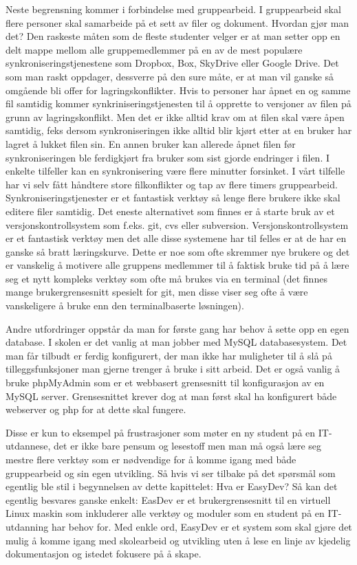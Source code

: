 Neste begrensning kommer i forbindelse med gruppearbeid. I gruppearbeid skal flere personer skal samarbeide på et sett av filer og dokument. Hvordan gjør man det? Den raskeste måten som de fleste studenter velger er at man setter opp en delt mappe mellom alle gruppemedlemmer på en av de mest populære synkroniseringstjenestene som Dropbox, Box, SkyDrive eller Google Drive. Det som man raskt oppdager, dessverre på den sure måte, er at man vil ganske så omgående bli offer for lagringskonflikter. Hvis to personer har åpnet en og samme fil samtidig kommer synkriniseringstjenesten til å opprette to versjoner av filen på grunn av lagringskonflikt. Men det er ikke alltid krav om at filen skal være åpen samtidig, feks dersom synkroniseringen ikke alltid blir kjørt etter at en bruker har lagret å lukket filen sin. En annen bruker kan allerede åpnet filen før synkroniseringen ble ferdigkjørt fra bruker som sist gjorde endringer i filen. I enkelte tilfeller kan en synkronisering være flere minutter forsinket. I vårt tilfelle har vi selv fått håndtere store filkonflikter og tap av flere timers gruppearbeid. Synkroniseringstjenester er et fantastisk verktøy så lenge flere brukere ikke skal editere filer samtidig. Det eneste alternativet som finnes er å starte bruk av et versjonskontrollsystem som f.eks. git, cvs eller subversion. Versjonskontrollsystem er et fantastisk verktøy men det alle disse systemene har til felles er at de har en ganske så bratt læringskurve. Dette er noe som ofte skremmer nye brukere og det er vanskelig å motivere alle gruppens medlemmer til å faktisk bruke tid på å lære seg et nytt kompleks verktøy som ofte må brukes via en terminal (det finnes mange brukergrensesnitt spesielt for git, men disse viser seg ofte å være vanskeligere å bruke enn den terminalbaserte løsningen).

Andre utfordringer oppstår da man for første gang har behov å sette opp en egen database. I skolen er det vanlig at man jobber med MySQL databasesystem. Det man får tilbudt er ferdig konfigurert, der man ikke har muligheter til å slå på tilleggsfunksjoner man gjerne trenger å bruke i sitt arbeid. Det er også vanlig å bruke phpMyAdmin som er et webbasert grensesnitt til konfigurasjon av en MySQL server. Grensesnittet krever dog at man først skal ha konfigurert både webserver og php for at dette skal fungere.

Disse er kun to eksempel på frustrasjoner som møter en ny student på en IT-utdannese, det er ikke bare pensum og lesestoff men man må også lære seg mestre flere verktøy som er nødvendige for å komme igang med både gruppearbeid og sin egen utvikling. Så hvis vi ser tilbake på det spørsmål som egentlig ble stil i begynnelsen av dette kapittelet: Hva er EasyDev? Så kan det egentlig besvares ganske enkelt: EasDev er et brukergrensesnitt til en virtuell Linux maskin som inkluderer alle verktøy og moduler som en student på en IT-utdanning har behov for. Med enkle ord, EasyDev er et system som skal gjøre det mulig å komme igang med skolearbeid og utvikling uten å lese en linje av kjedelig dokumentasjon og istedet fokusere på å skape.

